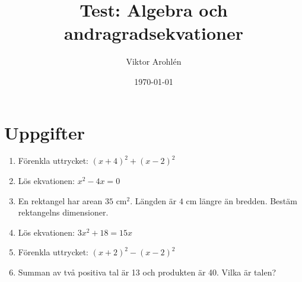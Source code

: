 \documentclass[a4paper,11pt]{article}
\title{Test: Algebra och andragradsekvationer}
\author{Viktor Arohlén}
\date{\today}
\begin{document}
\maketitle

\section*{Uppgifter}
\begin{enumerate}[label=\textbf{\arabic*.}]
    \item Förenkla uttrycket: $(x+4)^2 + (x-2)^2$

    \item Lös ekvationen: $x^2 - 4x = 0$

    \item En rektangel har arean $35\text{ cm}^2$. Längden är $4\text{ cm}$ längre än bredden. Bestäm rektangelns dimensioner.

    \item Lös ekvationen: $3x^2 + 18 = 15x$

    \item Förenkla uttrycket: $(x+2)^2 - (x-2)^2$

    \item Summan av två positiva tal är 13 och produkten är 40. Vilka är talen?

\end{enumerate}

\newpage
\end{document}
